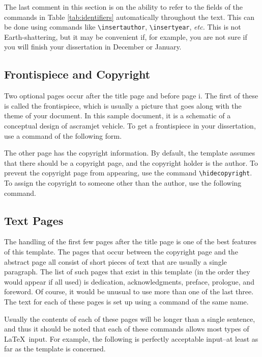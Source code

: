\documentclass[thesis]{../cls/thesis-umich}
\begin{document}
The last comment in this section is on the ability to refer to the
fields of the commands in Table \ref{tab:identifiers} automatically
throughout the text.  This can be done using commands like
\verb|\insertauthor|, \verb|\insertyear|, \textit{etc.}  This is not
Earth-shattering, but it may be convenient if, for example, you are
not sure if you will finish your dissertation in December or January.

\subsection{Frontispiece and Copyright}
Two optional pages occur after the title page and before page i.  The
first of these is called the frontispiece, which is usually a picture
that goes along with the theme of your document.  In this sample
document, it is a schematic of a conceptual design of ascramjet vehicle.
To get a frontispiece in your dissertation, use a command of the
following form.
\begin{code}
\frontispiece{\texttt{[image: ...]}}
\end{code}

The other page has the copyright information.  By default, the template
assumes that there should be a copyright page, and the copyright
holder is the author.  To prevent the copyright page from appearing,
use the command \verb|\hidecopyright|.  To assign the copyright to
someone other than the author, use the following command.
\begin{code}
\end{code}


\subsection{Text Pages}  \label{ssec:dedication}
The handling of the first few pages after the title page is one of the
best features of this template.  The pages that occur between the
copyright page and the abstract page all consist of short pieces of text
that are usually a single paragraph.  The list of such pages that exist
in this template (in the order they would appear if all used) is
dedication, acknowledgments, preface, prologue, and foreword.  Of
course, it would be unusual to use more than one of the last three.
The text for each of these pages is set up using a command of the same
name.
\begin{code}
\end{code}
Usually the contents of each of these pages will be longer than a single
sentence, and thus it should be noted that each of these commands allows
most types of \LaTeX~input.  For example, the following is perfectly
acceptable input--at least as far as the template is concerned.
\begin{code}
\end{code}
\end{document}
